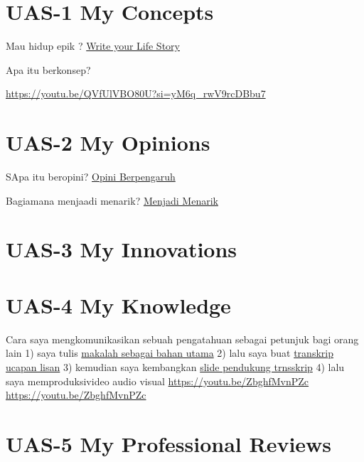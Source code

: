 \documentclass[
  letterpaper,
  DIV=11,
  numbers=noendperiod]{scrreprt}
\begin{document}

\chapter{UAS-1 My Concepts}\label{uas-1-my-concepts}

Mau hidup epik ? \href{lifestory.pdf}{Write your Life Story}

Apa itu berkonsep?

\url{https://youtu.be/QVfUlVBO80U?si=yM6q_rwV9rcDBbu7}


\chapter{UAS-2 My Opinions}\label{uas-2-my-opinions}

SApa itu beropini? \href{BM\%20Opini.mp4}{Opini Berpengaruh}

Bagiamana menjaadi menarik? \href{./Interesting.mp4}{Menjadi Menarik}


\chapter{UAS-3 My Innovations}\label{uas-3-my-innovations}


\chapter{UAS-4 My Knowledge}\label{uas-4-my-knowledge}

Cara saya mengkomunikasikan sebuah pengatahuan sebagai petunjuk bagi
orang lain 1) saya tulis
\href{Rekomendasi\%20Presentasi\%20Efektif(Contoh\%20Makalah).pdf}{makalah
sebagai bahan utama} 2) lalu saya buat
\href{Contoh\%20Transkrip\%20Presentasi.pdf}{transkrip ucapan lisan} 3)
kemudian saya kembangkan
\href{Rekomendasi\%20Presentasi\%20(Contoh\%20Slides).pdf}{slide
pendukung trnsskrip} 4) lalu saya memproduksivideo audio visual
\url{https://youtu.be/ZbghfMvnPZc} \url{https://youtu.be/ZbghfMvnPZc}


\chapter{UAS-5 My Professional
Reviews}\label{uas-5-my-professional-reviews}
\end{document}
